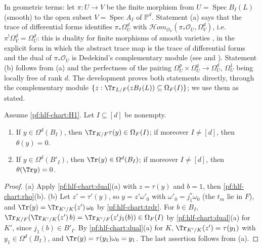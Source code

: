 In geometric terms: let $\pi\colon U\to V$ be the finite morphism from $U=\operatorname{Spec}B_I(L)$ (smooth) to the open subset
$V=\operatorname{Spec}A_I$ of $\mathbb P^d$. Statement (a) says that the trace of differential forms identifies $\pi_*\Omega^d_U$ with
$\mathcal Hom_{\mathcal O_V}(\pi_*\mathcal O_U,\Omega^d_V)$, i.e.\ $\pi^!\Omega^d_V=\Omega^d_U$: this is duality for finite morphisms of smooth
varieties \cite[III, Ex.~6.10 and Ex.~7.2]{Hartshorne1977}, in the explicit form in which the abstract trace map is the trace of differential
forms and the dual of $\pi_*\mathcal O_U$ is Dedekind's complementary module (see \cite{Kunz1986} and \cite{Lipman1984}). Statement (b)
follows from (a) and the perfectness of the pairing $\Omega^p_U\times\Omega^q_U\to\Omega^d_U$, $\Omega^1_U$ being locally free of rank $d$.
The development proves both statements directly, through the complementary module $\{z:\Tr_{L/F}(zB_I(L))\subseteq\Omega_F(I)\}$; we use
them as stated.

\begin{lemma}\label{pf:hlf-chart:trreg}
Assume \ref{pf:hlf-chart:H1}. Let $I\subseteq[d]$ be nonempty.
\begin{enumerate}[label=\textup{(\alph*)},nosep]
\item If $y\in\Omega^d(B_I)$, then $\Tr_{K/F}\tau(y)\in\Omega_F(I)$; if moreover $I\ne[d]$, then $\theta(y)=0$.
\item If $y\in\Omega^d(B'_I)$, then $\Tr(y)\in\Omega^d(B_I)$; if moreover $I\ne[d]$, then $\theta(\Tr y)=0$.
\end{enumerate}
\end{lemma}

\begin{proof}
(a) Apply \cref{pf:hlf-chart:dual}(a) with $z=\tau(y)$ and $b=1$, then \cref{pf:hlf-chart:rho}(b). (b) Let $z'=\tau'(y)$, so $y=z'\omega'_0$
with $\omega'_0=j_1^*\omega_0$ (the $t_m$ lie in $F$), and $\Tr(y)=\Tr_{K'/K}(z')\,\omega_0$ by \cref{pf:hlf-chart:trdr}. For $b\in B_I$,
$\Tr_{K/F}(\Tr_{K'/K}(z')\,b)=\Tr_{K'/F}(z'j_1(b))\in\Omega_F(I)$ by \cref{pf:hlf-chart:dual}(a) for $K'$, since $j_1(b)\in B'_I$. By
\cref{pf:hlf-chart:dual}(a) for $K$, $\Tr_{K'/K}(z')=\tau(y_1)$ with $y_1\in\Omega^d(B_I)$, and $\Tr(y)=\tau(y_1)\omega_0=y_1$. The last
assertion follows from (a).
\end{proof}

